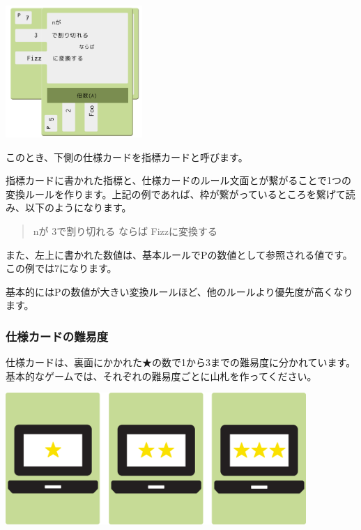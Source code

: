 \documentclass[index]{subfiles}
\begin{document}
\begin{center}
  \includegraphics[height=5cm]{image/103_index_card.png}
\end{center}

このとき、下側の仕様カードを{\sf 指標カード}と呼びます。

指標カードに書かれた{\sf 指標}と、仕様カードの{\sf ルール文面}とが繋がることで1つの変換ルールを作ります。上記の例であれば、枠が繋がっているところを繋げて読み、以下のようになります。

\begin{quote}
nが
3で割り切れる
    ならば
Fizzに変換する
\end{quote}

また、左上に書かれた数値は、基本ルールで{\sf Pの数値}として参照される値です。この例では7になります。

基本的にはPの数値が大きい変換ルールほど、他のルールより優先度が高くなります。

  \subsubsection{仕様カードの難易度}

仕様カードは、裏面にかかれた★の数で1から3までの難易度に分かれています。基本的なゲームでは、それぞれの難易度ごとに山札を作ってください。

\begin{center}
  \includegraphics[height=5cm]{image/104_spec_card_behind.png}
\end{center}
\end{document}
